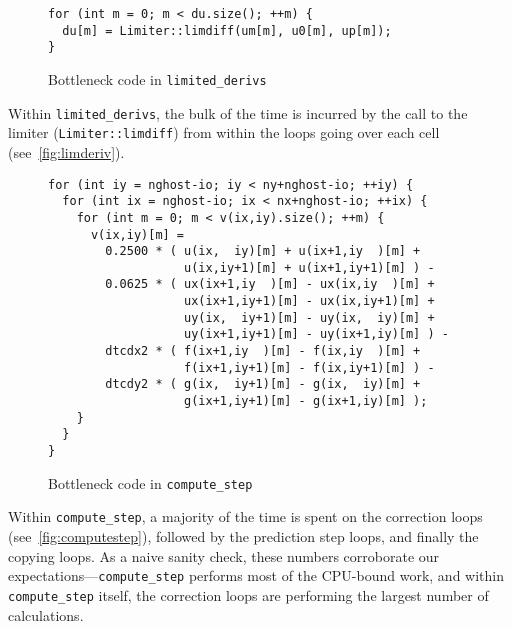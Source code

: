 \documentclass{scrartcl}
\begin{document}
    \begin{figure}[ht!]
    \begin{lstlisting}
for (int m = 0; m < du.size(); ++m) {
  du[m] = Limiter::limdiff(um[m], u0[m], up[m]);
}
    \end{lstlisting}
    \cprotect\caption{Bottleneck code in \verb|limited_derivs|\label{fig:limderiv}}
    \end{figure}

    Within \verb|limited_derivs|, the bulk of the time is incurred by the call to the limiter (\verb|Limiter::limdiff|) from within the loops going over each cell (see~\autoref{fig:limderiv}).

    \begin{figure}[ht!]
    \begin{lstlisting}
for (int iy = nghost-io; iy < ny+nghost-io; ++iy) {
  for (int ix = nghost-io; ix < nx+nghost-io; ++ix) {
    for (int m = 0; m < v(ix,iy).size(); ++m) {
      v(ix,iy)[m] =
        0.2500 * ( u(ix,  iy)[m] + u(ix+1,iy  )[m] +
                   u(ix,iy+1)[m] + u(ix+1,iy+1)[m] ) -
        0.0625 * ( ux(ix+1,iy  )[m] - ux(ix,iy  )[m] +
                   ux(ix+1,iy+1)[m] - ux(ix,iy+1)[m] +
                   uy(ix,  iy+1)[m] - uy(ix,  iy)[m] +
                   uy(ix+1,iy+1)[m] - uy(ix+1,iy)[m] ) -
        dtcdx2 * ( f(ix+1,iy  )[m] - f(ix,iy  )[m] +
                   f(ix+1,iy+1)[m] - f(ix,iy+1)[m] ) -
        dtcdy2 * ( g(ix,  iy+1)[m] - g(ix,  iy)[m] +
                   g(ix+1,iy+1)[m] - g(ix+1,iy)[m] );
    }
  }
}
    \end{lstlisting}
    \cprotect\caption{Bottleneck code in \verb|compute_step|\label{fig:computestep}}
    \end{figure}

    Within \verb|compute_step|, a majority of the time is spent on the correction loops (see~\autoref{fig:computestep}), followed by the prediction step loops, and finally the copying loops. As a naive sanity check, these numbers corroborate our expectations---\verb|compute_step| performs most of the CPU-bound work, and within \verb|compute_step| itself, the correction loops are performing the largest number of calculations.
\end{document}
